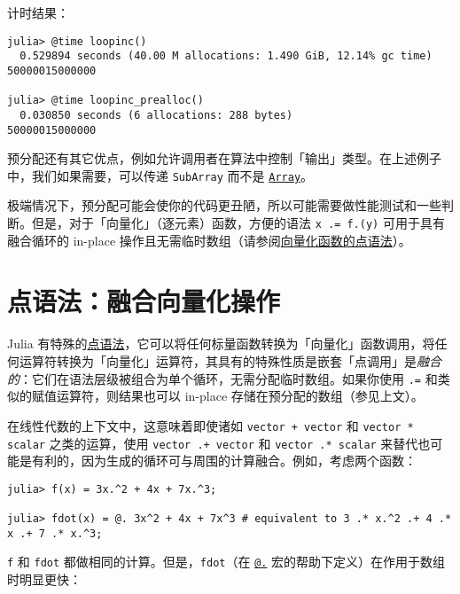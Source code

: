 计时结果：




\begin{verbatim}
julia> @time loopinc()
  0.529894 seconds (40.00 M allocations: 1.490 GiB, 12.14% gc time)
50000015000000

julia> @time loopinc_prealloc()
  0.030850 seconds (6 allocations: 288 bytes)
50000015000000
\end{verbatim}



预分配还有其它优点，例如允许调用者在算法中控制「输出」类型。在上述例子中，我们如果需要，可以传递 \texttt{SubArray} 而不是 \hyperlink{15492651498431872487}{\texttt{Array}}。



极端情况下，预分配可能会使你的代码更丑陋，所以可能需要做性能测试和一些判断。但是，对于「向量化」（逐元素）函数，方便的语法 \texttt{x .= f.(y)} 可用于具有融合循环的 in-place 操作且无需临时数组（请参阅\hyperlink{17801130558550430478}{向量化函数的点语法}）。



\hypertarget{12965993905966303435}{}


\section{点语法：融合向量化操作}



Julia 有特殊的\hyperlink{17801130558550430478}{点语法}，它可以将任何标量函数转换为「向量化」函数调用，将任何运算符转换为「向量化」运算符，其具有的特殊性质是嵌套「点调用」是\emph{融合的}：它们在语法层级被组合为单个循环，无需分配临时数组。如果你使用 \texttt{.=} 和类似的赋值运算符，则结果也可以 in-place 存储在预分配的数组（参见上文）。



在线性代数的上下文中，这意味着即使诸如 \texttt{vector + vector} 和 \texttt{vector * scalar} 之类的运算，使用 \texttt{vector .+ vector} 和 \texttt{vector .* scalar} 来替代也可能是有利的，因为生成的循环可与周围的计算融合。例如，考虑两个函数：




\begin{verbatim}
julia> f(x) = 3x.^2 + 4x + 7x.^3;

julia> fdot(x) = @. 3x^2 + 4x + 7x^3 # equivalent to 3 .* x.^2 .+ 4 .* x .+ 7 .* x.^3;
\end{verbatim}



\texttt{f} 和 \texttt{fdot} 都做相同的计算。但是，\texttt{fdot}（在 \hyperlink{16688502228717894452}{\texttt{@.}} 宏的帮助下定义）在作用于数组时明显更快：




